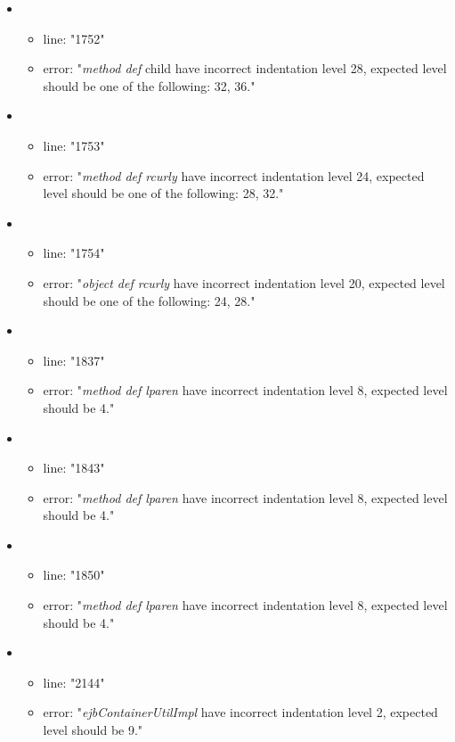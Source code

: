 \begin{itemize}
	\item 
	\begin{itemize} 
		\item line: "1752" 
		\item error: "\emph{method def} child have incorrect indentation level 28, expected level should be one of the following: 32, 36." 
	\end{itemize}
	\item 
	\begin{itemize} 
		\item line: "1753" 
		\item error: "\emph{method def rcurly} have incorrect indentation level 24, expected level should be one of the following: 28, 32." 
	\end{itemize}
	\item 
	\begin{itemize} 
		\item line: "1754" 
		\item error: "\emph{object def rcurly} have incorrect indentation level 20, expected level should be one of the following: 24, 28." 
	\end{itemize}
	\item 
	\begin{itemize} 
		\item line: "1837" 
		\item error: "\emph{method def lparen} have incorrect indentation level 8, expected level should be 4." 
	\end{itemize}
	\item 
	\begin{itemize} 
		\item line: "1843" 
		\item error: "\emph{method def lparen} have incorrect indentation level 8, expected level should be 4." 
	\end{itemize}
	\item 
	\begin{itemize} 
		\item line: "1850" 
		\item error: "\emph{method def lparen} have incorrect indentation level 8, expected level should be 4." 
	\end{itemize}
	\item 
	\begin{itemize} 
		\item line: "2144" 
		\item error: "\emph{ejbContainerUtilImpl} have incorrect indentation level 2, expected level should be 9." 

\end{itemize}
\end{itemize}
